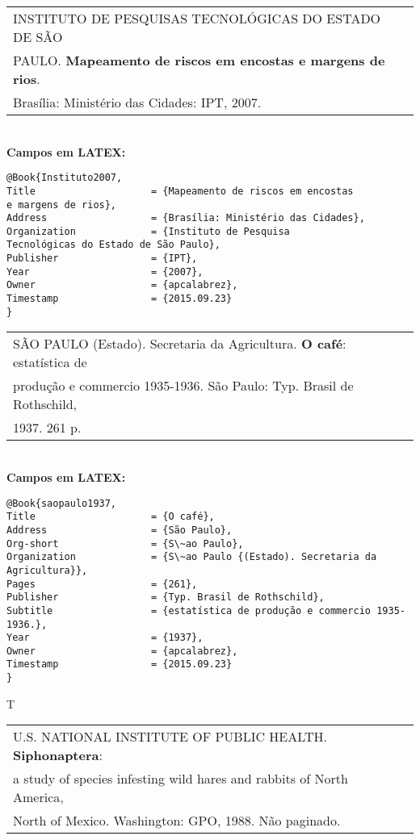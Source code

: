 \begin{tabular}{|l|c|} \hline
	INSTITUTO DE PESQUISAS TECNOLÓGICAS DO ESTADO DE SÃO \\
	PAULO.  \textbf{Mapeamento de riscos em encostas e margens de rios}. \\ 
	Brasília: Ministério das Cidades: IPT, 2007.   \\\hline
\end{tabular}\\

\textbf{Campos em LATEX:}

\begin{verbatim}
@Book{Instituto2007,
Title                    = {Mapeamento de riscos em encostas
e margens de rios},
Address                  = {Brasília: Ministério das Cidades},
Organization             = {Instituto de Pesquisa
Tecnológicas do Estado de São Paulo},
Publisher                = {IPT},
Year                     = {2007},
Owner                    = {apcalabrez},
Timestamp                = {2015.09.23}
}
\end{verbatim}

\begin{tabular}{|l|c|} \hline
	SÃO PAULO (Estado). Secretaria da Agricultura. \textbf{O café}: estatística de \\produção e commercio 1935-1936. São Paulo: Typ. Brasil de Rothschild, \\1937. 261 p.  \\\hline
\end{tabular}\\

\textbf{Campos em LATEX:}

\begin{verbatim}
@Book{saopaulo1937,
Title                    = {O café},
Address                  = {São Paulo},
Org-short                = {S\~ao Paulo},
Organization             = {S\~ao Paulo {(Estado). Secretaria da 
Agricultura}},
Pages                    = {261},
Publisher                = {Typ. Brasil de Rothschild},
Subtitle                 = {estatística de produção e commercio 1935-
1936.},
Year                     = {1937},
Owner                    = {apcalabrez},
Timestamp                = {2015.09.23}
}
\end{verbatim}
T

\begin{tabular}{|l|c|} \hline
	U.S. NATIONAL INSTITUTE OF PUBLIC HEALTH. \textbf{Siphonaptera}: \\  a study
	of species infesting wild hares and rabbits of North America,\\ North of Mexico. Washington: GPO, 1988. Não paginado.  \\\hline
\end{tabular}\\

